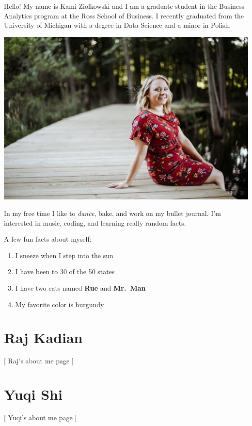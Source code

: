 \documentclass[
]{book}
\providecommand{\tightlist}{%
  \setlength{\itemsep}{0pt}\setlength{\parskip}{0pt}}
\begin{document}
Hello! My name is Kami Ziolkowski and I am a graduate student in the Business Analytics program at the Ross School of Business. I recently graduated from the University of Michigan with a degree in Data Science and a minor in Polish.

\includegraphics{me2.jpg}

In my free time I like to \emph{dance}, bake, and work on my bullet journal. I'm interested in music, coding, and learning really random facts.

A few fun facts about myself:

\begin{enumerate}
\def\labelenumi{\arabic{enumi}.}
\tightlist
\item
  I sneeze when I step into the sun
\item
  I have been to 30 of the 50 states
\item
  I have two cats named \textbf{Rue} and \textbf{Mr.~Man}
\item
  My favorite color is burgundy
\end{enumerate}

\hypertarget{raj-kadian}{%
\section{Raj Kadian}\label{raj-kadian}}

{[} Raj's about me page {]}

\hypertarget{yuqi-shi}{%
\section{Yuqi Shi}\label{yuqi-shi}}

{[} Yuqi's about me page {]}
\end{document}
